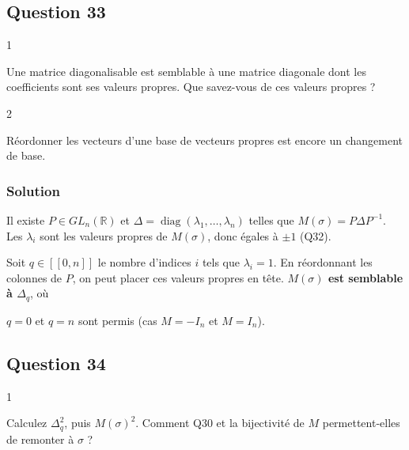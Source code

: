 \documentclass[11pt,a4paper]{article}
\newcommand{\equationajustee}[1]{%
  \sbox{\boiteequation}{$\displaystyle #1$}%
  \ifdim\wd\boiteequation>\linewidth
    \[\resizebox{\linewidth}{!}{\usebox{\boiteequation}}\]%
  \else
    \[#1\]%
  \fi}
\begin{document}
\hypertarget{question-33}{%
\subsection{Question 33}\label{question-33}}

\begin{indication}{1}

Une matrice diagonalisable est semblable à une matrice diagonale dont les coefficients sont ses valeurs propres. Que savez-vous de ces valeurs propres ?

\end{indication}

\begin{indication}{2}

Réordonner les vecteurs d'une base de vecteurs propres est encore un changement de base.

\end{indication}

\hypertarget{solution-32}{%
\subsubsection{Solution}\label{solution-32}}

Il existe \(P\in GL_n(\mathbb R)\) et \(\Delta=\operatorname{diag}(\lambda_1,\dots,\lambda_n)\) telles que \(M(\sigma)=P\Delta P^{-1}\). Les \(\lambda_i\) sont les valeurs propres de \(M(\sigma)\), donc égales à \(\pm1\) (Q32).

Soit \(q\in[\![0,n]\!]\) le nombre d'indices \(i\) tels que \(\lambda_i=1\). En réordonnant les colonnes de \(P\), on peut placer ces valeurs propres en tête. \textbf{\(M(\sigma)\) est semblable à \(\Delta_q\)}, où
\equationajustee{\Delta_q=\operatorname{diag}(\underbrace{1,\dots,1}_{q},\underbrace{-1,\dots,-1}_{n-q}).}

\begin{piege}

\(q=0\) et \(q=n\) sont permis (cas \(M=-I_n\) et \(M=I_n\)).

\end{piege}

\hypertarget{question-34}{%
\subsection{Question 34}\label{question-34}}

\begin{indication}{1}

Calculez \(\Delta_q^2\), puis \(M(\sigma)^2\). Comment Q30 et la bijectivité de \(M\) permettent-elles de remonter à \(\sigma\) ?

\end{indication}
\end{document}
